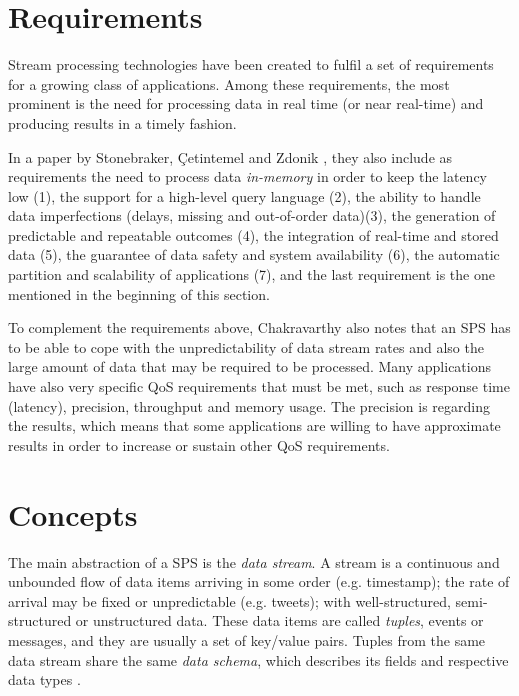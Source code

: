 \documentclass[ppgc,diss,english]{iiufrgs}
\begin{document}
\section{Requirements}
\label{sec:esp:requirements}

Stream processing technologies have been created to fulfil a set of requirements for a growing class of applications. Among these requirements, the most prominent is the need for processing data in real time (or near real-time) and producing results in a timely fashion.

In a paper by Stonebraker, {\c{C}}etintemel and Zdonik \cite{stonebraker20058}, they also include as requirements the need to process data \emph{in-memory} in order to keep the latency low (1), the support for a high-level query language (2), the ability to handle data imperfections (delays, missing and out-of-order data)(3), the generation of predictable and repeatable outcomes (4), the integration of real-time and stored data (5), the guarantee of data safety and system availability (6), the automatic partition and scalability of applications (7), and the last requirement is the one mentioned in the beginning of this section.

To complement the requirements above, Chakravarthy \cite{chakravarthy2009stream} also notes that an SPS has to be able to cope with the unpredictability of data stream rates and also the large amount of data that may be required to be processed. Many applications have also very specific QoS requirements that must be met, such as response time (latency), precision, throughput and memory usage. The precision is regarding the results, which means that some applications are willing to have approximate results in order to increase or sustain other QoS requirements.


\section{Concepts}
\label{sec:esp:concepts}

The main abstraction of a SPS is the \emph{data stream}. A stream is a continuous and unbounded flow of data items arriving in some order (e.g. timestamp); the rate of arrival may be fixed or unpredictable (e.g. tweets); with well-structured, semi-structured or unstructured data. These data items are called \emph{tuples}, events or messages, and they are usually a set of key/value pairs. Tuples from the same data stream share the same \emph{data schema}, which describes its fields and respective data types \cite{chakravarthy2009stream}.
\end{document}
